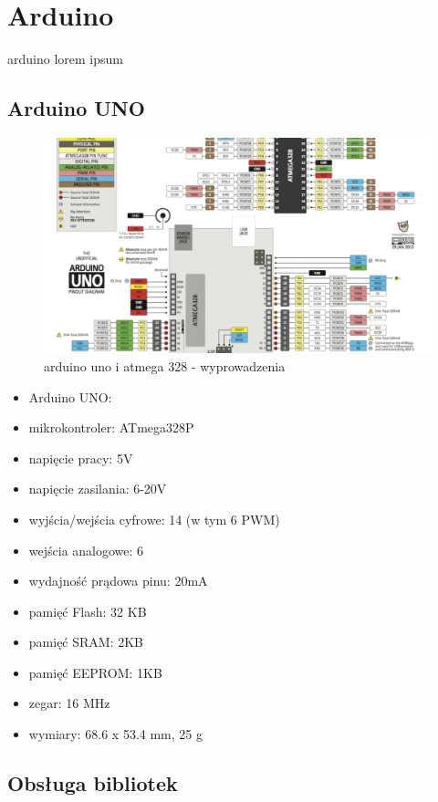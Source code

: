 \documentclass{article}
\begin{document}
\section{Arduino}
arduino lorem ipsum

\subsection{Arduino UNO}

\begin{figure}[H]
	\center
	\includegraphics[scale=0.4]{img/arduino-pinout.png}
	\caption{arduino uno i atmega 328 - wyprowadzenia}
	\label{fig:img6}
\end{figure}

\begin{itemize}
	\item Arduino UNO:
\item mikrokontroler: 		ATmega328P
\item napięcie pracy: 			5V
\item napięcie zasilania: 		6-20V
\item wyjścia/wejścia cyfrowe: 	14 (w tym 6 PWM)
\item wejścia analogowe: 		6
\item wydajność prądowa pinu: 	20mA
\item pamięć Flash: 			32 KB 
\item pamięć SRAM: 			2KB
\item pamięć EEPROM: 		1KB
\item zegar: 				16 MHz
\item wymiary: 			68.6 x 53.4 mm, 25 g
\end{itemize}

\subsection{Obsługa bibliotek}
\end{document}
